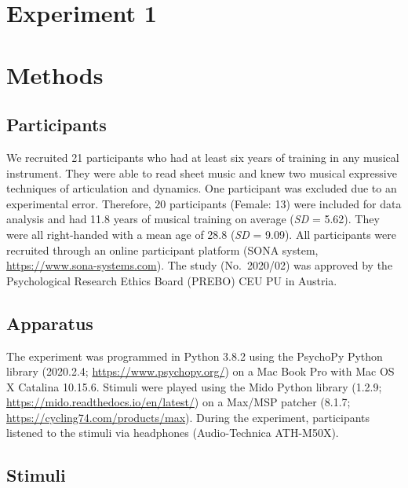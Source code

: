 \documentclass[
  man,floatsintext]{apa6}
\begin{document}
\hypertarget{experiment-1}{%
\section{Experiment 1}\label{experiment-1}}

\hypertarget{methods}{%
\section{Methods}\label{methods}}

\hypertarget{participants}{%
\subsection{Participants}\label{participants}}

We recruited 21 participants who had at least six years of training in any musical instrument. They were able to read sheet music and knew two musical expressive techniques of articulation and dynamics. One participant was excluded due to an experimental error. Therefore, 20 participants (Female: 13) were included for data analysis and had 11.8 years of musical training on average (\emph{SD} = 5.62). They were all right-handed with a mean age of 28.8 (\emph{SD} = 9.09). All participants were recruited through an online participant platform (SONA system, \url{https://www.sona-systems.com}). The study (No.~2020/02) was approved by the Psychological Research Ethics Board (PREBO) CEU PU in Austria.

\hypertarget{apparatus}{%
\subsection{Apparatus}\label{apparatus}}

The experiment was programmed in Python 3.8.2 using the PsychoPy Python library (2020.2.4; \url{https://www.psychopy.org/}) on a Mac Book Pro with Mac OS X Catalina 10.15.6. Stimuli were played using the Mido Python library (1.2.9; \url{https://mido.readthedocs.io/en/latest/}) on a Max/MSP patcher (8.1.7; \url{https://cycling74.com/products/max}). During the experiment, participants listened to the stimuli via headphones (Audio-Technica ATH-M50X).

\hypertarget{stimuli}{%
\subsection{Stimuli}\label{stimuli}}
\end{document}
